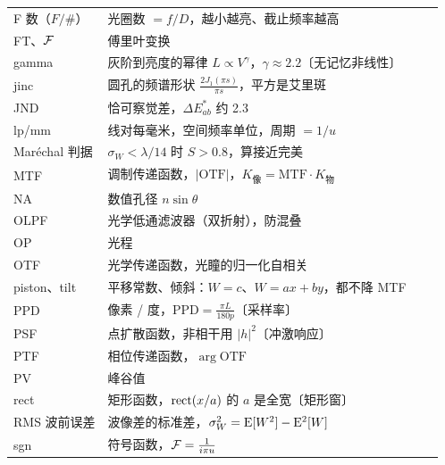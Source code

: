 {\begin{longtable}{@{}P{3.45cm}P{11.75cm}>{\raggedleft\arraybackslash}p{0.72cm}>{\raggedleft\arraybackslash}p{0.72cm}@{}}
F 数（$F/\#$） & 光圈数 $=f/D$，越小越亮、截止频率越高 & \pageref{sec:p-geom} & \pageref{sec:stops}\\
FT、$\mathcal{F}$ & 傅里叶变换 & \pageref{sec:p-spfreq} & \pageref{fml:pairs}\\
gamma & 灰阶到亮度的幂律 $L\propto V^\gamma$，$\gamma\approx2.2$〔无记忆非线性〕 & \pageref{sec:p-eye} & \pageref{sec:gammacalc}\\
jinc & 圆孔的频谱形状 $\frac{2J_1(\pi s)}{\pi s}$，平方是艾里斑 & \pageref{sec:p-diff} & \pageref{fml:pairs}\\
JND & 恰可察觉差，$\Delta E^*_{ab}$ 约 2.3 &  & \pageref{sec:lab}\\
lp/mm & 线对每毫米，空间频率单位，周期 $=1/u$ & \pageref{sec:p-spfreq} & \pageref{sec:spfreq}\\
Maréchal 判据 & $\sigma_W<\lambda/14$ 时 $S>0.8$，算接近完美 & \pageref{sec:p-aberr} & \pageref{ex:strehl-tplA}\\
MTF & 调制传递函数，$|\mathrm{OTF}|$，$K_{\text{像}}=\mathrm{MTF}\cdot K_{\text{物}}$ & \pageref{sec:p-imaging} & \pageref{sec:typeE}\\
NA & 数值孔径 $n\sin\theta$ & \pageref{sec:p-pupil} & \pageref{sec:stops}\\
OLPF & 光学低通滤波器（双折射），防混叠 & \pageref{sec:p-eye} & \pageref{sec:typeF}\\
OP & 光程 & \pageref{sec:p-wave} & \pageref{sec:opwave}\\
OTF & 光学传递函数，光瞳的归一化自相关 & \pageref{sec:p-imaging} & \pageref{sec:typeB}\\
piston、tilt & 平移常数、倾斜：$W=c$、$W=ax+by$，都不降 MTF & \pageref{sec:p-aberr} & \pageref{sec:mtfproof}\\
PPD & 像素 / 度，$\mathrm{PPD}=\frac{\pi L}{180p}$〔采样率〕 & \pageref{sec:p-eye} & \pageref{sec:screencpd}\\
PSF & 点扩散函数，非相干用 $|h|^2$〔冲激响应〕 & \pageref{sec:p-imaging} & \pageref{sec:typeD}\\
PTF & 相位传递函数，$\arg\mathrm{OTF}$ & \pageref{sec:p-imaging} & \pageref{sec:typeG}\\
PV & 峰谷值 & \pageref{sec:p-aberr} & \pageref{sec:aberrms}\\
rect & 矩形函数，$\operatorname{rect}(x/a)$ 的 $a$ 是全宽〔矩形窗〕 & \pageref{sec:p-screen} & \pageref{fml:pairs}\\
RMS 波前误差 & 波像差的标准差，$\sigma_W^2=\mathrm{E}[W^2]-\mathrm{E}^2[W]$ & \pageref{sec:p-aberr} & \pageref{sec:aberrms}\\
sgn & 符号函数，$\mathcal{F}=\frac{1}{i\pi u}$ &  & \pageref{fml:pairs}\\

\end{longtable}}
